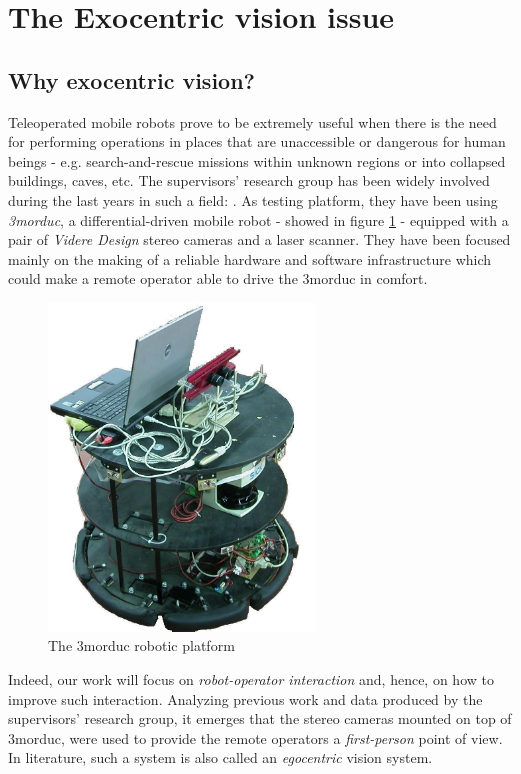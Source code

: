 \section{The Exocentric vision issue}
\label{sec:exo}
\subsection{Why exocentric vision?}
Teleoperated mobile robots prove to be extremely useful 
when there is the need for performing operations in places that 
are unaccessible or dangerous for human beings - e.g. 
search-and-rescue missions within unknown regions or into 
collapsed buildings, caves, etc.
%
The supervisors' research group has been widely involved 
during the last years in such a field: \cite{livatino2010}.
%
As testing platform, they have been using \textit{3morduc},
a differential-driven mobile robot - showed in figure \ref{fig:3morduc} -
equipped with a pair of \textit{Videre Design} \cite{videredesign} 
stereo cameras and a laser scanner. They have been focused 
mainly on the making of a reliable hardware and software 
infrastructure which could make a remote operator able to drive 
the 3morduc in comfort.
%
\begin{figure}[!h]
  \begin{center}
    \includegraphics[width=200pt]{img/3morduc.jpg}  %
    \caption{The 3morduc robotic platform}
    \label{fig:3morduc}
  \end{center}
\end{figure}
%
Indeed, our work will focus on \textit{robot-operator interaction} and, 
hence, on how to improve such interaction. 
%
Analyzing previous work and data produced by the supervisors' 
research group, it emerges that the stereo cameras mounted on 
top of 3morduc, were used to provide the remote operators a 
\textit{first-person} point of view. In literature, such a 
system is also called an \textit{egocentric} vision system.
%


